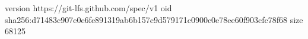 version https://git-lfs.github.com/spec/v1
oid sha256:d71483c907e0e6fe891319ab6b157c9d579171c0900c0e78ee60f903cfc78f68
size 68125
